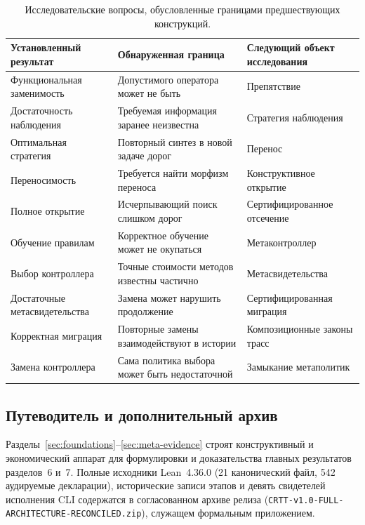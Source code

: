 \begin{table}[h]
\centering
\footnotesize
\begin{tabular}{@{}>{\raggedright\arraybackslash}p{3.6cm}>{\raggedright\arraybackslash}p{5.2cm}>{\raggedright\arraybackslash}p{4.6cm}@{}}
\toprule
\textbf{Установленный результат} & \textbf{Обнаруженная граница} & \textbf{Следующий объект исследования} \\
\midrule
Функциональная заменимость & Допустимого оператора может не быть & Препятствие \\
Достаточность наблюдения & Требуемая информация заранее неизвестна & Стратегия наблюдения \\
Оптимальная стратегия & Повторный синтез в новой задаче дорог & Перенос \\
Переносимость & Требуется найти морфизм переноса & Конструктивное открытие \\
Полное открытие & Исчерпывающий поиск слишком дорог & Сертифицированное отсечение \\
Обучение правилам & Корректное обучение может не окупаться & Метаконтроллер \\
Выбор контроллера & Точные стоимости методов известны частично & Метасвидетельства \\
Достаточные метасвидетельства & Замена может нарушить продолжение & Сертифицированная миграция \\
Корректная миграция & Повторные замены взаимодействуют в истории & Композиционные законы трасс \\
Замена контроллера & Сама политика выбора может быть недостаточной & Замыкание метаполитик \\
\bottomrule
\end{tabular}
\caption{Исследовательские вопросы, обусловленные границами предшествующих конструкций.}
\label{tab:genesis}
\end{table}

\subsection{Путеводитель и дополнительный архив}
Разделы~\ref{sec:foundations}--\ref{sec:meta-evidence} строят конструктивный и экономический аппарат для формулировки и доказательства главных результатов разделов~6 и~7. Полные исходники Lean~4.36.0 (21 канонический файл, 542 аудируемые декларации), исторические записи этапов и девять свидетелей исполнения CLI содержатся в согласованном архиве релиза (\texttt{CRTT-v1.0-FULL-ARCHITECTURE-RECONCILED.zip}), служащем формальным приложением.

